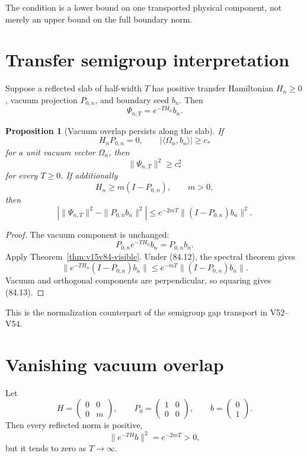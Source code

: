 \documentclass[11pt]{article}
\newtheorem{proposition}[theorem]{Proposition}
\theoremstyle{remark}
\begin{document}
The condition is a lower bound on one transported physical
component, not merely an upper bound on the full boundary norm.

\section{Transfer semigroup interpretation}

Suppose a reflected slab of half-width \(T\) has positive transfer
Hamiltonian \(H_n\geq0\), vacuum projection \(P_{0,n}\), and
boundary seed \(b_n\).  Then
\[
 \Psi_{n,T}=e^{-TH_n}b_n.                             \tag{84.9}
\]

\begin{proposition}[Vacuum overlap persists along the slab]
\label{prop:v15v84-semigroup}
If
\[
 H_nP_{0,n}=0,\qquad
 |\langle\Omega_n,b_n\rangle|\geq c_*                 \tag{84.10}
\]
for a unit vacuum vector \(\Omega_n\), then
\[
 \|\Psi_{n,T}\|^2\geq c_*^2                           \tag{84.11}
\]
for every \(T\geq0\).  If additionally
\[
 H_n\geq m(I-P_{0,n}),\qquad m>0,                     \tag{84.12}
\]
then
\[
 \left|
 \|\Psi_{n,T}\|^2-\|P_{0,n}b_n\|^2
 \right|
 \leq e^{-2mT}\|(I-P_{0,n})b_n\|^2.                  \tag{84.13}
\]
\end{proposition}

\begin{proof}
The vacuum component is unchanged:
\[
 P_{0,n}e^{-TH_n}b_n=P_{0,n}b_n.
\]
Apply Theorem~\ref{thm:v15v84-visible}.  Under (84.12), the spectral
theorem gives
\[
 \|e^{-TH_n}(I-P_{0,n})b_n\|
 \leq e^{-mT}\|(I-P_{0,n})b_n\|.
\]
Vacuum and orthogonal components are perpendicular, so squaring
gives (84.13).
\end{proof}

This is the normalization counterpart of the semigroup gap
transport in V52--V54.

\section{Vanishing vacuum overlap}

\begin{counterexample}
\label{cnt:v15v84-orthogonal}
Let
\[
 H=
 \begin{pmatrix}0&0\\0&m\end{pmatrix},\qquad
 P_0=
 \begin{pmatrix}1&0\\0&0\end{pmatrix},\qquad
 b=
 \begin{pmatrix}0\\1\end{pmatrix}.                   \tag{84.14}
\]
Then every reflected norm is positive,
\[
 \|e^{-TH}b\|^2=e^{-2mT}>0,                           \tag{84.15}
\]
but it tends to zero as \(T\to\infty\).
\end{counterexample}
\end{document}
